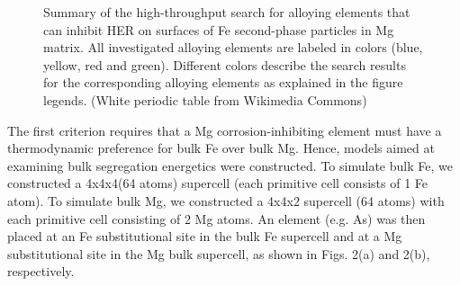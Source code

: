 \begingroup
\begin{figure}[!ht]
  \centering
  \caption[Summary of the high-throughput search for alloying elements that can inhibit HER on surfaces of Fe second-phase particles in Mg matrix]{Summary of the high-throughput search for alloying elements that can inhibit \ac{HER} on surfaces of Fe second-phase particles in Mg matrix. All investigated alloying elements are labeled in colors (blue, yellow, red and green). Different colors describe the search results for the corresponding alloying elements as explained in the figure legends. (White periodic table from Wikimedia Commons)}
  \label{Chap:Mg_H:fig4}
\end{figure}
\endgroup


The first criterion requires that a Mg corrosion-inhibiting element must have a thermodynamic preference for bulk Fe over bulk Mg. Hence, models aimed at examining bulk segregation energetics were constructed. To simulate bulk Fe, we constructed a 4x4x4(64 atoms) supercell (each primitive cell consists of 1 Fe atom). To simulate bulk Mg, we constructed a 4x4x2 supercell (64 atoms) with each primitive cell consisting of 2 Mg atoms. An element (e.g. As) was then placed at an Fe substitutional site in the bulk Fe supercell and at a Mg substitutional site in the Mg bulk supercell, as shown in Figs. 2(a) and 2(b), respectively.

